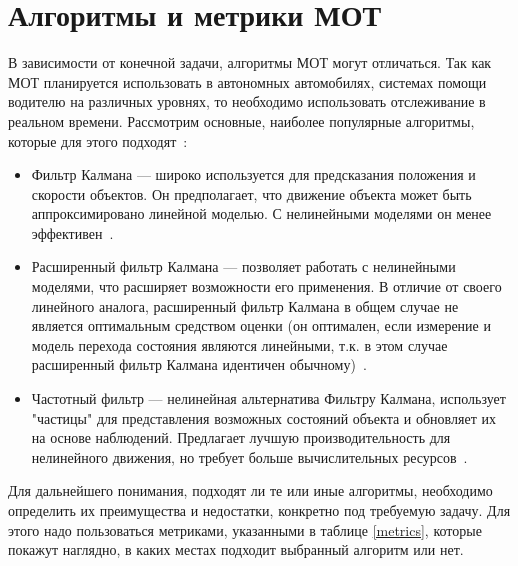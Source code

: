 \section{Алгоритмы и метрики МОТ}
В зависимости от конечной задачи, алгоритмы МОТ могут отличаться. Так как МОТ планируется использовать в автономных автомобилях, системах помощи водителю на различных уровнях, то необходимо использовать отслеживание в реальном времени. Рассмотрим основные, наиболее популярные алгоритмы, которые для этого подходят~\cite{Article::Luo2021}:

\begin{itemize}
	
	\item Фильтр Калмана --- широко используется для предсказания положения и скорости объектов. Он предполагает, что движение объекта может быть аппроксимировано линейной моделью. С нелинейными моделями он менее эффективен~\cite{Rodriguez2011}.
	
	\item Расширенный фильтр Калмана --- позволяет работать с нелинейными моделями, что расширяет возможности его применения. В отличие от своего линейного аналога, расширенный фильтр Калмана в общем случае не является оптимальным средством оценки (он оптимален, если измерение и модель перехода состояния являются линейными, т.к. в этом случае расширенный фильтр Калмана идентичен обычному)~\cite{Mitzel2011, ExtendetKalmanFilter2023}. 
	
	\item Частотный фильтр --- нелинейная альтернатива Фильтру Калмана, использует "частицы" для представления возможных состояний объекта и обновляет их на основе наблюдений. Предлагает лучшую производительность для нелинейного движения, но требует больше вычислительных ресурсов~\cite{Yang2009}.

	
\end{itemize}

Для дальнейшего понимания, подходят ли те или иные алгоритмы, необходимо определить их преимущества и недостатки, конкретно под требуемую задачу. Для этого надо пользоваться метриками, указанными в таблице \ref{metrics}, которые покажут наглядно, в каких местах подходит выбранный алгоритм или нет.

